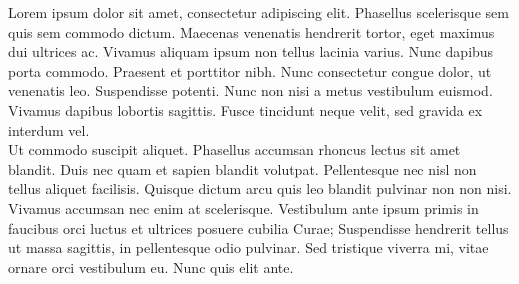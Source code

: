 Lorem ipsum dolor sit amet, consectetur adipiscing elit. Phasellus scelerisque sem quis sem commodo dictum. Maecenas venenatis hendrerit tortor, eget maximus dui ultrices ac. Vivamus aliquam ipsum non tellus lacinia varius. Nunc dapibus porta commodo. Praesent et porttitor nibh. Nunc consectetur congue dolor, ut venenatis leo. Suspendisse potenti. Nunc non nisi a metus vestibulum euismod. Vivamus dapibus lobortis sagittis. Fusce tincidunt neque velit, sed gravida ex interdum vel.\\

Ut commodo suscipit aliquet. Phasellus accumsan rhoncus lectus sit amet blandit. Duis nec quam et sapien blandit volutpat. Pellentesque nec nisl non tellus aliquet facilisis. Quisque dictum arcu quis leo blandit pulvinar non non nisi. Vivamus accumsan nec enim at scelerisque. Vestibulum ante ipsum primis in faucibus orci luctus et ultrices posuere cubilia Curae; Suspendisse hendrerit tellus ut massa sagittis, in pellentesque odio pulvinar. Sed tristique viverra mi, vitae ornare orci vestibulum eu. Nunc quis elit ante.\\
\newpage
\thispagestyle{empty}